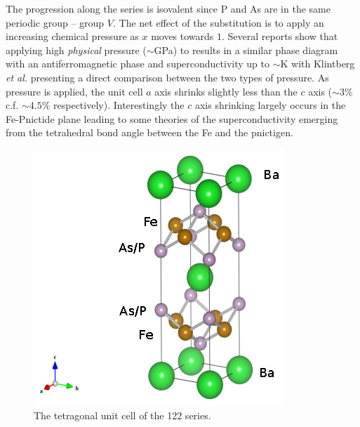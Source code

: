  The progression along the series is isovalent since P and As are in the same periodic group -- group $V$. The net effect of the substitution is to apply an increasing chemical pressure as $x$ moves towards $1$. Several reports show that applying high \textit{physical} pressure ($\sim$\unit[5]{GPa}) to \BaFeAs results in a similar phase diagram with an antiferromagnetic phase and superconductivity up to $\sim$\unit[30]{K}\cite{Yamazaki2010,Colombier2009,Alireza2009} with Klintberg \textit{et al.}\cite{Klintberg2010} presenting a direct comparison between the two types of pressure. As pressure is applied, the unit cell $a$ axis shrinks slightly less than the $c$ axis ($\sim3\%$ c.f. $\sim4.5\%$ respectively). Interestingly the $c$ axis shrinking largely occurs in the Fe-Pnictide plane leading to some theories of the superconductivity emerging from the tetrahedral bond angle between the Fe and the pnictigen. 
\begin{figure}[htbp]
    \begin{center}
        \includegraphics[scale=1.0]{Chapter-Introduction/Figures/UnitCell/UnitCell}
        \caption{The tetragonal unit cell of the 122 \BaFePAs series.}
        \label{Fig:Intro:UnitCell}
    \end{center}
\end{figure}


